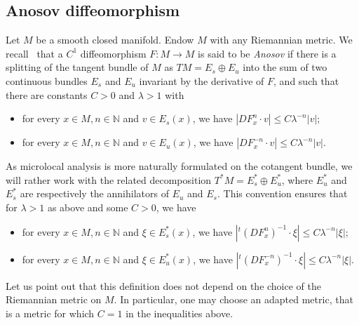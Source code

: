 \documentclass[AHL,Unicode,longabstracts,published]{cedram}
\newcommand{\bbN}{\mathbb{N}}
\begin{document}
\subsection{Anosov diffeomorphism}\label{subsection:Anosov_diffeomorphisms}

Let $M$ be a smooth closed manifold. Endow $M$ with any Riemannian metric. We recall~\cite[Definition~6.4.2]{katok_hasselblatt} that a $C^1$ diffeomorphism $F: M \to M$ is said to be \emph{Anosov} if there is a splitting of the tangent bundle of $M$ as $TM = E_s \oplus E_u$ into the sum of two continuous bundles $E_s$ and $E_u$ invariant by the derivative of $F$, and such that there are constants $C > 0$ and $\lambda > 1$ with
\begin{itemize}
\item for every $x \in M, n \in \bbN$ and $v \in E_s(x)$, we have $|DF^{n}_x \cdot v| \leq C \lambda^{-n} |v|$;
\item for every $x \in M, n \in \bbN$ and $v \in E_u(x)$, we have $|DF^{-n}_x \cdot v| \leq C \lambda^{-n} |v|$.
\end{itemize}

As microlocal analysis is more naturally formulated on the cotangent bundle, we will rather work with the related decomposition $T^* M = E_s^* \oplus E_u^*$, where $E_u^*$ and $E_s^*$ are respectively the annihilators of $E_u$ and $E_s$. This convention ensures that for $\lambda > 1$ as above and some $C > 0$, we have
\begin{itemize}
\item for every $x \in M, n \in \bbN$ and $\xi \in E_s^*(x)$, we have $|{}^t (DF^{n}_x)^{-1} \cdot \xi| \leq C \lambda^{-n} |\xi|$;
\item for every $x \in M, n \in \bbN$ and $\xi \in E_u^*(x)$, we have $|{}^t (DF^{-n}_x)^{-1} \cdot \xi| \leq C \lambda^{-n} |\xi|$.
\end{itemize}

Let us point out that this definition does not depend on the choice of the Riemannian metric on $M$. In particular, one may choose an adapted metric, that is a metric for which $C = 1$ in the inequalities above.
\end{document}
